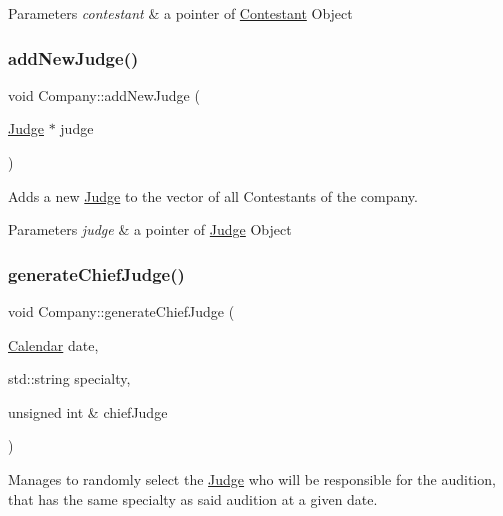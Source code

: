 \begin{DoxyParams}{Parameters}
{\em contestant} & a pointer of \hyperlink{class_contestant}{Contestant} Object \\
\hline
\end{DoxyParams}
\mbox{\label{class_company_a0103d856876e3cb9188d1bf71903baff}} 
\subsubsection{\texorpdfstring{add\+New\+Judge()}{addNewJudge()}}
{\footnotesize\ttfamily void Company\+::add\+New\+Judge (\begin{DoxyParamCaption}\item[{\hyperlink{class_judge}{Judge} $\ast$}]{judge }\end{DoxyParamCaption})}



Adds a new \hyperlink{class_judge}{Judge} to the vector of all Contestants of the company. 


\begin{DoxyParams}{Parameters}
{\em judge} & a pointer of \hyperlink{class_judge}{Judge} Object \\
\hline
\end{DoxyParams}
\mbox{\label{class_company_af5121e8ac79b845e06a1c592f9db41d3}} 
\subsubsection{\texorpdfstring{generate\+Chief\+Judge()}{generateChiefJudge()}}
{\footnotesize\ttfamily void Company\+::generate\+Chief\+Judge (\begin{DoxyParamCaption}\item[{\hyperlink{class_calendar}{Calendar}}]{date,  }\item[{std\+::string}]{specialty,  }\item[{unsigned int \&}]{chief\+Judge }\end{DoxyParamCaption})}



Manages to randomly select the \hyperlink{class_judge}{Judge} who will be responsible for the audition, that has the same specialty as said audition at a given date. 


